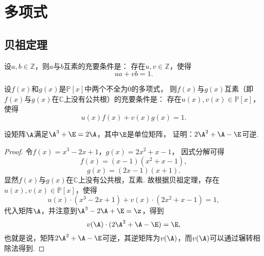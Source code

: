 \section{多项式}
\subsection{贝祖定理}
\begin{theorem}
设\(a,b\in\mathbb{Z}\)，则\(a\)与\(b\)互素的充要条件是：
存在\(u,v\in\mathbb{Z}\)，使得\[
	u a + v b = 1.
\]
\end{theorem}

\begin{corollary}
设\(f(x)\)和\(g(x)\)是\(\mathbb{P}[x]\)中两个不全为0的多项式，
则\(f(x)\)与\(g(x)\)互素（即\(f(x)\)与\(g(x)\)在\(\mathbb{C}\)上没有公共根）的充要条件是：
存在\(u(x),v(x)\in\mathbb{P}[x]\)，使得\[
	u(x) f(x) + v(x) g(x) = 1.
\]
\end{corollary}

\begin{example}
设矩阵\(\A\)满足\(\A^3+\E=2\A\)，其中\(\E\)是单位矩阵，
证明：\(2\A^2+\A-\E\)可逆.
\begin{proof}
令\(f(x)=x^3-2x+1\)，\(g(x)=2x^2+x-1\)，
因式分解可得\[
	f(x) = (x-1)(x^2+x-1),
\]\[
	g(x) = (2x-1)(x+1).
\]
显然\(f(x)\)与\(g(x)\)在\(\mathbb{C}\)上没有公共根，互素.
故根据贝祖定理，存在\(u(x),v(x)\in\mathbb{P}[x]\)，使得\[
u(x) \cdot (x^3-2x+1) + v(x) \cdot (2x^2+x-1) = 1,
\]代入矩阵\(\A\)，并注意到\(\A^3-2\A+\E=\z\)，得到\[
v(\A) \cdot (2\A^2+\A-\E) = \E,
\]也就是说，矩阵\(2\A^2+\A-\E\)可逆，其逆矩阵为\(v(\A)\)，而\(v(\A)\)可以通过辗转相除法得到.
\end{proof}
\end{example}

